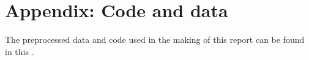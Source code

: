 \documentclass{article}
\begin{document}
	
	\def\code#1{\texttt{#1}}
	
	
	
	\newpage
	\tableofcontents
	
	\newpage
	
	
	\newpage
	
	\newpage
	
	\newpage
	
	\newpage
	
	
	\section{Appendix: Code and data} \label{appendix}
	
	The preprocessed data and code used in the making of this report can be found in this \href{https://github.com/cosmourao/sarcasm-tm}{\color{blue}{repository}}.
	
	
\end{document}
